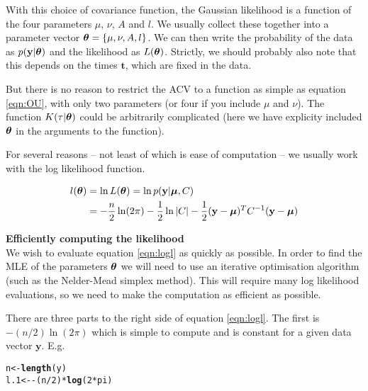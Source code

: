 \documentclass[a4paper, 11pt, amsmath, graphicx]{article}\usepackage[]{graphicx}\usepackage[]{color}
\makeatletter
\newcommand{\hlnum}[1]{\textcolor[rgb]{0.686,0.059,0.569}{#1}}%
\newcommand{\hlopt}[1]{\textcolor[rgb]{0,0,0}{#1}}%
\newcommand{\hlstd}[1]{\textcolor[rgb]{0.345,0.345,0.345}{#1}}%
\newcommand{\hlkwb}[1]{\textcolor[rgb]{0.69,0.353,0.396}{#1}}%
\newcommand{\hlkwd}[1]{\textcolor[rgb]{0.737,0.353,0.396}{\textbf{#1}}}%
\newenvironment{kframe}{%
 \def\at@end@of@kframe{}%
 \ifinner\ifhmode%
  \def\at@end@of@kframe{\end{minipage}}%
  \begin{minipage}{\columnwidth}%
 \fi\fi%
 \def\FrameCommand##1{\hskip\@totalleftmargin \hskip-\fboxsep
 \colorbox{shadecolor}{##1}\hskip-\fboxsep
     \hskip-\linewidth \hskip-\@totalleftmargin \hskip\columnwidth}%
 \MakeFramed {\advance\hsize-\width
   \@totalleftmargin\z@ \linewidth\hsize
   \@setminipage}}%
 {\par\unskip\endMakeFramed%
 \at@end@of@kframe}
\newenvironment{knitrout}{}{} %
\def\bmu{{\mbox{\boldmath $\mu$}}}
\def\bt{{\mbox{\boldmath $\theta$}}}
\makeatother
\begin{document}
With this choice of covariance function, the Gaussian likelihood is a function of the four  parameters $\mu$, $\nu$, $A$ and $l$. We usually collect these together into a parameter vector $\bt = \{ \mu, \nu, A, l \}$. We can then write the probability of the data as $p(\mathbf{y}|\bt)$ and the likelihood as $L(\bt)$. Strictly, we should probably also note that this depends on the times $\mathbf{t}$, which are fixed in the data.

But there is no reason to restrict the ACV to a function as simple as equation \ref{eqn:OU}, with only two parameters (or four if you include $\mu$ and $\nu$). The function $K(\tau| \bt)$ could be arbitrarily complicated (here we have explicity included $\bt$ in the arguments to the function).

For several reasons -- not least of which is ease of computation -- we usually work with the log likelihood function. 

\begin{align}
 l(\bt) & = \ln L(\bt) = \ln p(\mathbf{y}|\bmu, C) \nonumber \\
        &  = - \frac{n}{2} \ln (2 \pi) - \frac{1}{2} \ln |C| - 
                 \frac{1}{2} (\mathbf{y} - \bmu)^T C^{-1} (\mathbf{y} - \bmu)
\label{eqn:logl}
\end{align}


\vspace{0.4cm}
\textbf{Efficiently computing the likelihood}
\\

We wish to evaluate equation \ref{eqn:logl} as quickly as possible. In order to find the MLE of the parameters $\bt$ we will need to use an iterative optimisation algorithm (such as the Nelder-Mead simplex method). This will require many log likelihood evaluations, so we need to make the computation as efficient as possible. 

There are three parts to the right side of equation \ref{eqn:logl}. The first is $- (n/2) \ln (2 \pi)$ which is simple to compute and is constant for a given data vector $\mathbf{y}$. E.g.

\begin{knitrout}
\color{fgcolor}\begin{kframe}
\begin{alltt}
   \hlstd{n} \hlkwb{<-} \hlkwd{length}\hlstd{(y)}
   \hlstd{l.1} \hlkwb{<-} \hlopt{-}\hlstd{(n}\hlopt{/}\hlnum{2}\hlstd{)} \hlopt{*} \hlkwd{log}\hlstd{(}\hlnum{2}\hlopt{*}\hlstd{pi)}
\end{alltt}
\end{kframe}
\end{knitrout}
\end{document}

